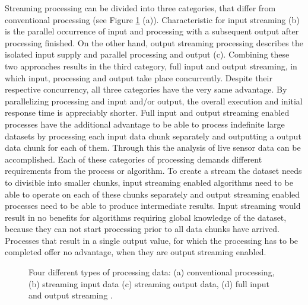 	Streaming processing can be divided into three categories, that differ from conventional processing (see Figure \ref{fig:streaming} (a)). Characteristic for input streaming (b) is the parallel occurrence of input and processing with a subsequent output after processing finished. On the other hand, output streaming processing describes the isolated input supply and parallel processing and output (c). Combining these two approaches results in the third category, full input and output streaming, in which input, processing and output take place concurrently. Despite their respective concurrency, all three categories have the very same advantage. By parallelizing processing and input and/or output, the overall execution and initial response time is appreciably shorter. Full input and output streaming enabled processes have the additional advantage to be able to process indefinite large datasets by processing each input data chunk separately and outputting a output data chunk for each of them. Through this the analysis of live sensor data can be accomplished.
	Each of these categories of processing demands different requirements from the process or algorithm. To create a stream the dataset needs to divisible into smaller chunks, input streaming enabled algorithms need to be able to operate on each of these chunks separately and output streaming enabled processes need to be able to produce intermediate results. Input streaming would result in no benefits for algorithms requiring global knowledge of the dataset, because they can not start processing prior to all data chunks have arrived. Processes that result in a single output value, for which the processing has to be completed offer no advantage, when they are output streaming enabled.

	\begin{figure}[!htb]
		\centering
		
		\caption{\label{fig:streaming}Four different types of processing data: (a) conventional processing, (b) streaming input data (c) streaming output data, (d) full input and output streaming \citep[based on][]{foerster2012live}.}
	\end{figure}

